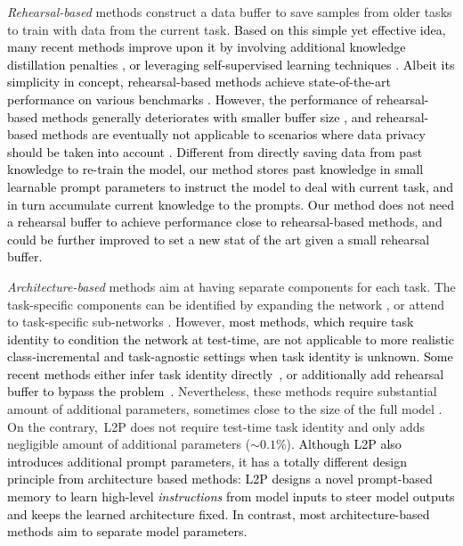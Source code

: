 \documentclass[10pt,twocolumn,letterpaper]{article}
\newcommand{\zifeng}[1]{\textcolor{black}{#1}}
\newcommand{\final}[1]{\textcolor{black}{#1}}
\newcommand{\cam}[1]{\textcolor{black}{#1}}
\newcommand{\methodabbr}{L2P\xspace}
\begin{document}
\emph{Rehearsal-based} methods \cite{chaudhry2018efficient, chaudhry2019tiny, hayes2019memory} construct a data buffer %
to save samples from older tasks to train with data from the current task. \zifeng{Based on this simple yet effective idea, many recent methods improve upon it by involving additional knowledge distillation penalties \cite{rebuffi2017icarl, wu2019large, chaudhry2020using, buzzega2020dark}, or leveraging self-supervised learning techniques \cite{cha2021co2l, pham2021dualnet}. Albeit its simplicity in concept, rehearsal-based methods achieve state-of-the-art performance on various benchmarks \cite{parisi2019continual, mai2021online}. However, the performance of rehearsal-based methods generally deteriorates with smaller buffer size \cite{cha2021co2l}, and rehearsal-based methods are eventually not applicable to scenarios where data privacy should be taken into account \cite{shokri2015privacy}. \final{Different from directly saving data from past knowledge to re-train the model, our method stores past knowledge in small learnable prompt parameters to instruct the model to deal with current task, and in turn accumulate current knowledge to the prompts.}
Our method does not need a rehearsal buffer to achieve performance close to rehearsal-based methods, and could be further improved to set a new stat of the art given a small rehearsal buffer.
}

\emph{Architecture-based} methods aim at having separate components for each task. The task-specific components can be identified by expanding the network \cite{rusu2016progressive, yoon2017lifelong, li2019learn, loo2020generalized, rao2019continual, zhao2022deep}, or attend to task-specific sub-networks \cite{mallya2018packnet, serra2018overcoming, wang2020learn, ke2020continual}. However, \cam{most methods, which require task identity to condition the network at test-time, are not applicable to more realistic class-incremental and task-agnostic settings when task identity is unknown. Some recent methods either infer task identity directly~\cite{wortsman2020supermasks}, or additionally add rehearsal buffer to bypass the problem~\cite{yan2021dynamically, pham2021dualnet}.} Nevertheless, these methods require substantial amount of additional parameters, sometimes close to the size of the full model \cite{wang2020learn, ke2020continual}. On the contrary,~\methodabbr does not require test-time task identity and only adds negligible amount of additional parameters ($\sim0.1\%$). \cam{Although \methodabbr also introduces additional prompt parameters, it has a totally different design principle from architecture based methods: \methodabbr designs a novel prompt-based memory to learn high-level \emph{instructions} from model inputs to steer model outputs and keeps the learned architecture fixed. In contrast, most architecture-based methods aim to separate model parameters.}
\end{document}
